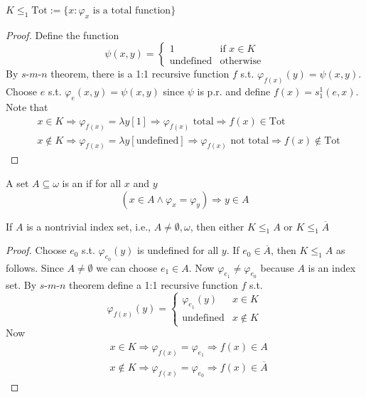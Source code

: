 \documentclass[11pt]{article}
\begin{document}
\begin{theorem}[]
\label{thm1}
\(K\le_1\text{Tot}:=\{x:\varphi_x\text{ is a total function}\}\)
\end{theorem}
\begin{proof}
Define the function
\begin{equation*}
\psi(x,y)=
\begin{cases}
1&\text{if } x\in K\\
\text{undefined} &\text{otherwise}
\end{cases}
\end{equation*}
By \(s\)-\(m\)-\(n\) theorem, there is a 1:1 recursive function \(f\) s.t.
\(\varphi_{f(x)}(y)=\psi(x,y)\). Choose \(e\) s.t. \(\varphi_e(x,y)=\psi(x,y)\) 
since \(\psi\) is p.r. and
define \(f(x)=s_1^1(e,x)\). Note that
\begin{align*}
&x\in K\Longrightarrow \varphi_{f(x)}=\lambda y[1]\Longrightarrow\varphi_{f(x)}\text{ total}
\Longrightarrow f(x)\in\text{Tot}\\
&x\not\in K\Longrightarrow\varphi_{f(x)}=\lambda y[\text{undefined}]\Longrightarrow
\varphi_{f(x)}\text{ not total}\Longrightarrow f(x)\not\in\text{Tot}
\end{align*}
\end{proof}

\begin{definition}[]
A set \(A\subseteq\omega\) is an  if for all \(x\) and \(y\)
\begin{equation*}
(x\in A\wedge\varphi_x=\varphi_y)\Longrightarrow y\in  A
\end{equation*}
\end{definition}

\begin{theorem}[]
If \(A\) is a nontrivial index set, i.e., \(A\neq \emptyset,\omega\), then either
\(K\le_1 A\) or \(K\le_1\overline{A}\)
\end{theorem}

\begin{proof}
Choose \(e_0\) s.t. \(\varphi_{e_0}(y)\) is undefined for all \(y\). If
\(e_0\in\overline{A}\), then \(K\le_1 A\) as follows. Since \(A\neq\emptyset\) we can
choose \(e_1\in A\). Now \(\varphi_{e_1}\neq\varphi_{e_0}\) because \(A\) is an
index set. By \(s\)-\(m\)-\(n\) theorem define a 1:1 recursive function \(f\)
s.t.
\begin{equation*}
\varphi_{f(x)}(y)=
\begin{cases}
\varphi_{e_1}(y)&x\in K\\
\text{undefined}&x\not\in K
\end{cases}
\end{equation*}
Now
\begin{align*}
&x\in K\Longrightarrow\varphi_{f(x)}=\varphi_{e_1}\Longrightarrow f(x)\in A\\
&x\not\in K\Longrightarrow\varphi_{f(x)}=\varphi_{e_0}\Longrightarrow
f(x)\in\overline{A}
\end{align*}
\end{proof}
\end{document}
